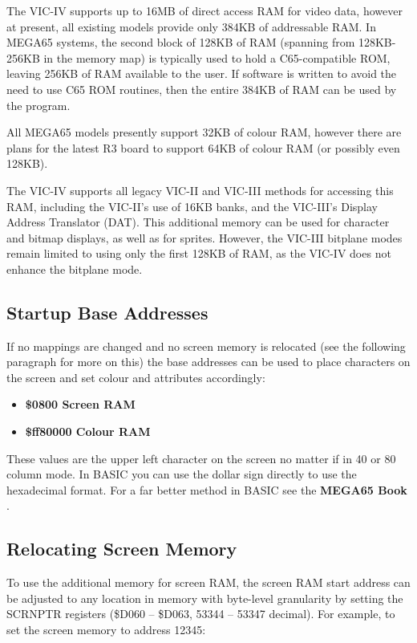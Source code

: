 The VIC-IV supports up to 16MB of direct access RAM for video data, however at present, all existing models provide only 384KB of addressable RAM.
In MEGA65 systems, the second block of 128KB of RAM (spanning from 128KB-256KB in the memory map) is typically used to hold a C65-compatible ROM,
leaving 256KB of RAM available to the user. If software is written to avoid the need to use C65 ROM routines, then the entire 384KB of RAM can be used by the program.

All MEGA65 models presently support 32KB of colour RAM, however there are plans for the latest R3 board to support 64KB of colour RAM (or possibly even 128KB).

The VIC-IV supports all legacy VIC-II and VIC-III methods for accessing this RAM, including the VIC-II's use of 16KB banks, and the VIC-III's Display Address Translator (DAT).  This additional memory can be used for character and bitmap displays, as well as for sprites.  However, the VIC-III bitplane modes remain limited to using only the first 128KB of RAM, as the VIC-IV does not enhance the bitplane mode.

\subsection{Startup Base Addresses}

If no mappings are changed and no screen memory is relocated (see the following paragraph
for more on this) the base addresses can be used to place characters on the screen and
set colour and attributes accordingly:

\begin{itemize}
  \item \bf{\$0800}  Screen RAM
  \item \bf{\$ff80000}  Colour RAM
\end{itemize}

These values are the upper left character on the screen no matter if in 40 or 80 column
mode. In BASIC you can use the dollar sign directly to use the hexadecimal format. For
a far better method in BASIC see
\ifdefined\printmanual
the {\bf MEGA65 Book}
\else
\fi
.

\subsection{Relocating Screen Memory}

To use the additional memory for screen RAM, the screen RAM start address can be adjusted to any location in memory with byte-level granularity by setting the SCRNPTR registers (\$D060 -- \$D063, 53344 -- 53347 decimal).  For example, to set the screen memory to address 12345:

